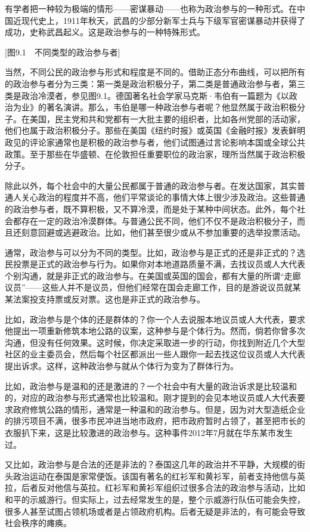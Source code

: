 有学者把一种较为极端的情形——密谋暴动——也称为政治参与的一种形式。在中国近现代史上，1911年秋天，武昌的少部分新军士兵与下级军官密谋暴动并获得了成功，史称武昌起义。这是政治参与的一种特殊形式。

[图9.1　不同类型的政治参与者]

当然，不同公民的政治参与形式和程度是不同的。借助正态分布曲线，可以把所有的政治参与者分为三类：第一类是政治积极分子，第二类是普通政治参与者，第三类是政治冷漠者，参见图9.1。德国著名社会学家马克斯·韦伯有一篇题为《以政治为业》的著名演讲。那么，韦伯是哪一种政治参与者呢？他显然属于政治积极分子。在美国，民主党和共和党都有一大批主要的组织者，比如各州党部的活动家，他们也属于政治积极分子。那些在美国《纽约时报》或英国《金融时报》发表鲜明政见的评论家通常也是积极的政治参与者，他们试图通过言论影响本国或全球公共政策。至于那些在华盛顿、在伦敦担任重要职位的政治家，理所当然属于政治积极分子。

除此以外，每个社会中的大量公民都属于普通的政治参与者。在发达国家，其实普通人关心政治的程度并不高，他们平常谈论的事情大体上很少涉及政治。这些普通的政治参与者，既不算积极，又不算冷漠，而是处于某种中间状态。此外，每个社会都存在一定的政治冷漠群体。与普通公民不同，他们不仅不是政治积极分子，而且还刻意回避或逃避政治。比如，他们甚至很少或从不参加重要的选举投票活动。

通常，政治参与可以分为不同的类型。比如，政治参与是正式的还是非正式的？选民投票是正式的政治参与行为。如果你对本地道路质量不满，去找议员或人大代表个别沟通，就是非正式的政治参与。在美国或英国的国会，都有大量的所谓“走廊议员”——这些人并不是议员，但他们经常在国会走廊工作，目的是游说议员就某某法案投支持票或反对票。这也是非正式的政治参与。

比如，政治参与是个体的还是群体的？你一个人去说服本地议员或人大代表，要求他提出一项重新修筑本地公路的议案，这种参与是个体行为。然而，倘若你曾多次沟通，但没有任何效果。这时候，你决定采取进一步的行动，你找到附近几个大型社区的业主委员会，然后每个社区都派出一些人跟你一起去找这位议员或人大代表提出诉求。这样，这种政治参与就从个体行为变为了群体行为。

比如，政治参与是温和的还是激进的？一个社会中有大量的政治诉求是比较温和的，对应的政治参与形式通常也比较温和。刚才提到的会见本地议员或人大代表要求政府修筑公路的情形，通常是一种温和的政治参与。但是，因为对大型造纸企业的排污项目不满，很多市民冲进当地市政府，把市政府暂时占领了，甚至把市长的衣服扒下来，这是比较激进的政治参与。这种事件2012年7月就在华东某市发生过。

又比如，政治参与是合法的还是非法的？泰国这几年的政治并不平静，大规模的街头政治运动在泰国是家常便饭。该国有著名的红衫军和黄衫军，前者支持他信与英拉，后者反对他信与英拉。红衫军和黄衫军组织过很多合法的政治参与活动，比如和平的示威游行。但实际上，过去经常发生的是，整个示威游行队伍可能会失控，很多人甚至试图占领机场或者是占领政府机构。后者无疑是非法的，有可能会导致社会秩序的瘫痪。

